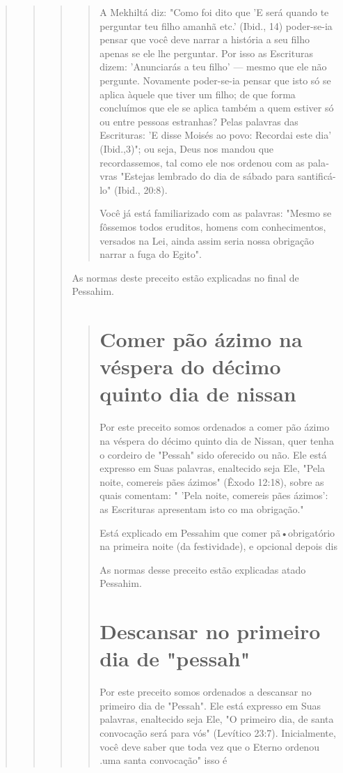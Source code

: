 \begin{quote}
\begin{quote}
\begin{quote}
\begin{quote}
A Mekhiltá diz: "Como foi dito que 'E será quando te perguntar teu filho
amanhã etc.' (Ibid., 14) poder-se-ia pensar que você deve narrar a
história a seu filho apenas se ele lhe perguntar. Por isso as Escrituras
dizem: 'Anunciarás a teu filho' --- mesmo que ele não pergunte.
Novamente poder-se-ia pensar que isto só se aplica àquele que tiver um
filho; de que forma concluímos que ele se aplica também a quem estiver
só ou entre pessoas estranhas? Pelas palavras das Escrituras: 'E disse
Moisés ao povo: Recordai este dia' (Ibid.,3)"; ou seja, Deus nos mandou
que recordassemos, tal como ele nos ordenou com as pala­vras "Estejas
lembrado do dia de sábado para santificá-lo" (Ibid., 20:8).

Você já está familiarizado com as palavras: "Mesmo se fôssemos to­dos
eruditos, homens com conhecimentos, versados na Lei, ainda assim seria
nossa obrigação narrar a fuga do Egito".
\end{quote}

As normas deste preceito estão explicadas no final de Pessahim.

\begin{quote}
\section{Comer pão ázimo na véspera do décimo quinto dia de nissan}

Por este preceito somos ordenados a comer pão ázimo na véspera do décimo
quinto dia de Nissan, quer tenha o cordeiro de "Pessah" sido oferecido ou não. Ele está expresso em Suas palavras, enaltecido seja Ele,
"Pela noi­te, comereis pães ázimos" (Êxodo 12:18), sobre as quais
comentam: " 'Pela noite, comereis pães ázimos': as Escrituras apresentam
isto co ma obrigação."

Está explicado em Pessahim que comer pã•obrigatório na primeira noite
(da festividade), e opcional depois dis

As normas desse preceito estão explicadas atado Pessahim.

\section{Descansar no primeiro dia de "pessah"}

Por este preceito somos ordenados a descansar no primeiro dia de
"Pessah". Ele está expresso em Suas palavras, enaltecido seja Ele, "O
primeiro dia, de santa convocação será para vós" (Levítico 23:7).
Inicialmente, você de­ve saber que toda vez que o Eterno ordenou
.uma santa convocação" isso é


\end{quote}
\end{quote}
\end{quote}
\end{quote}

